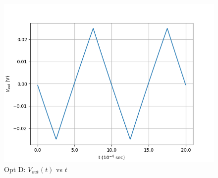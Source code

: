 \documentclass[journal,12pt,twocolumn]{IEEEtran}
\theoremstyle{remark}
\begin{document}
\begin{enumerate}
\begin{figure}[!h]
        \includegraphics[width = \columnwidth]{figs/opt_d_res.png}
        \caption{Opt D: $V_{out}(t)$ vs $t$}
        \label{fig:opt_d_res_gate.ph.23.37}
    \end{figure}
\end{enumerate}
\end{document}
